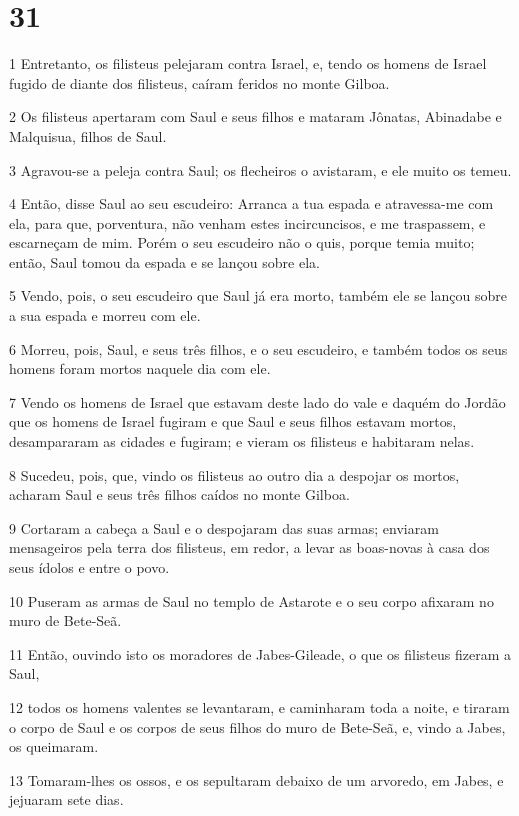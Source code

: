 \chapter{31}

\par 1 Entretanto, os filisteus pelejaram contra Israel, e, tendo os homens de Israel fugido de diante dos filisteus, caíram feridos no monte Gilboa.
\par 2 Os filisteus apertaram com Saul e seus filhos e mataram Jônatas, Abinadabe e Malquisua, filhos de Saul.
\par 3 Agravou-se a peleja contra Saul; os flecheiros o avistaram, e ele muito os temeu.
\par 4 Então, disse Saul ao seu escudeiro: Arranca a tua espada e atravessa-me com ela, para que, porventura, não venham estes incircuncisos, e me traspassem, e escarneçam de mim. Porém o seu escudeiro não o quis, porque temia muito; então, Saul tomou da espada e se lançou sobre ela.
\par 5 Vendo, pois, o seu escudeiro que Saul já era morto, também ele se lançou sobre a sua espada e morreu com ele.
\par 6 Morreu, pois, Saul, e seus três filhos, e o seu escudeiro, e também todos os seus homens foram mortos naquele dia com ele.
\par 7 Vendo os homens de Israel que estavam deste lado do vale e daquém do Jordão que os homens de Israel fugiram e que Saul e seus filhos estavam mortos, desampararam as cidades e fugiram; e vieram os filisteus e habitaram nelas.
\par 8 Sucedeu, pois, que, vindo os filisteus ao outro dia a despojar os mortos, acharam Saul e seus três filhos caídos no monte Gilboa.
\par 9 Cortaram a cabeça a Saul e o despojaram das suas armas; enviaram mensageiros pela terra dos filisteus, em redor, a levar as boas-novas à casa dos seus ídolos e entre o povo.
\par 10 Puseram as armas de Saul no templo de Astarote e o seu corpo afixaram no muro de Bete-Seã.
\par 11 Então, ouvindo isto os moradores de Jabes-Gileade, o que os filisteus fizeram a Saul,
\par 12 todos os homens valentes se levantaram, e caminharam toda a noite, e tiraram o corpo de Saul e os corpos de seus filhos do muro de Bete-Seã, e, vindo a Jabes, os queimaram.
\par 13 Tomaram-lhes os ossos, e os sepultaram debaixo de um arvoredo, em Jabes, e jejuaram sete dias.


